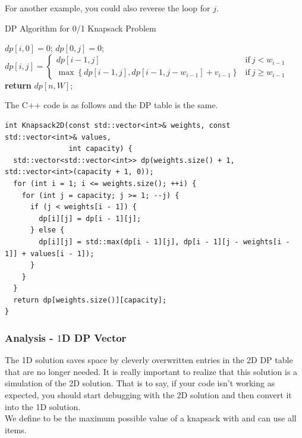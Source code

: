 For another example, you could also reverse the loop for $j$.
\begin{algorithm}[H]\label{algorithm:01_knapsack_problem_3}
\caption{DP Algorithm for 0/1 Knapsack Problem}
\begin{algorithmic}[1]
 
    \State $dp[i, 0] = 0$;
\EndFor
{}  
    \State $dp[0, j] = 0$;
\EndFor
{}
    \For{{\color{magenta}{$j = W$ to $1$}}}
        \State 
        $dp[i, j] = 
        \begin{cases} 
            dp[i - 1, j] & \text{if}\ j < w_{i-1}\\
            \max\left\{dp[i - 1, j], dp[i - 1, j - w_{i-1}] + v_{i-1}\right\} & \text{if}\ j \geq w_{i-1}
        \end{cases}$
    \EndFor
\EndFor
\State \textbf{return} $dp[n, W]$;
\end{algorithmic}
\end{algorithm}
The C++ code is as follows and the DP table is the same.
\begin{lstlisting}
int Knapsack2D(const std::vector<int>& weights, const std::vector<int>& values,
               int capacity) {
  std::vector<std::vector<int>> dp(weights.size() + 1, std::vector<int>(capacity + 1, 0));
  for (int i = 1; i <= weights.size(); ++i) {
    for (int j = capacity; j >= 1; --j) {
      if (j < weights[i - 1]) {
        dp[i][j] = dp[i - 1][j];
      } else {
        dp[i][j] = std::max(dp[i - 1][j], dp[i - 1][j - weights[i - 1]] + values[i - 1]);
      }
    }
  }
  return dp[weights.size()][capacity];
}
\end{lstlisting}

\subsubsection{Analysis - $1$D DP Vector}
The 1D solution saves space by cleverly overwritten entries in the 2D DP table that are no longer needed. It is really important to realize that this solution is a simulation of the 2D solution. That is to say, if your code isn't working as expected, you should start debugging with the 2D solution and then convert it into the 1D solution.\\

We define {\color{blue}{$ dp[j] $}} to be the maximum possible value of a knapsack with {\color{blue}{capacity $ j $}} and can use all items.\\

